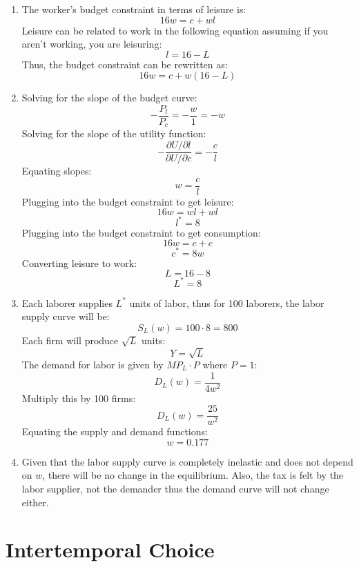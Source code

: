 \documentclass{article}
\begin{document}
\begin{enumerate}
    \item The worker's budget constraint in terms of leisure is:
        $$ 16 w = c + w l$$
        Leisure can be related to work in the following equation assuming if you
        aren't working, you are leisuring:
        $$ l = 16 - L $$
        Thus, the budget constraint can be rewritten as:
        $$ 16 w = c + w (16 - L)$$
    \item Solving for the slope of the budget curve:
        $$-\frac{P_l}{P_c} = -\frac{w}{1} = -w$$
        Solving for the slope of the utility function:
        $$-\frac{\partial U / \partial l}{\partial U / \partial c} =
        -\frac{c}{l}$$
        Equating slopes:
        $$w = \frac{c}{l}$$
        Plugging into the budget constraint to get leisure:
        $$16 w = w l + w l$$
        $$l^* = 8$$
        Plugging into the budget constraint to get consumption:
        $$16 w = c + c$$
        $$c^* = 8 w$$
        Converting leisure to work:
        $$L = 16 - 8$$
        $$L^* = 8$$
    \item Each laborer supplies $L^*$ units of labor, thus for 100 laborers,
        the labor supply curve will be:
        $$S_L(w) = 100 \cdot 8 = 800$$
        Each firm will produce $\sqrt{L}$ units:
        $$Y = \sqrt{L}$$
        The demand for labor is given by $MP_L \cdot P$ where $P=1$:
        $$D_L(w) = \frac{1}{4 w^2}$$
        Multiply this by 100 firms:
        $$D_L(w) = \frac{25}{w^2}$$
        Equating the supply and demand functions:
        $$w = 0.177$$
    \item Given that the labor supply curve is completely inelastic and does not
        depend on $w$, there will be no change in the equilibrium. Also, the tax
        is felt by the labor supplier, not the demander thus the demand curve
        will not change either.
\end{enumerate}

\section{Intertemporal Choice}
\end{document}
